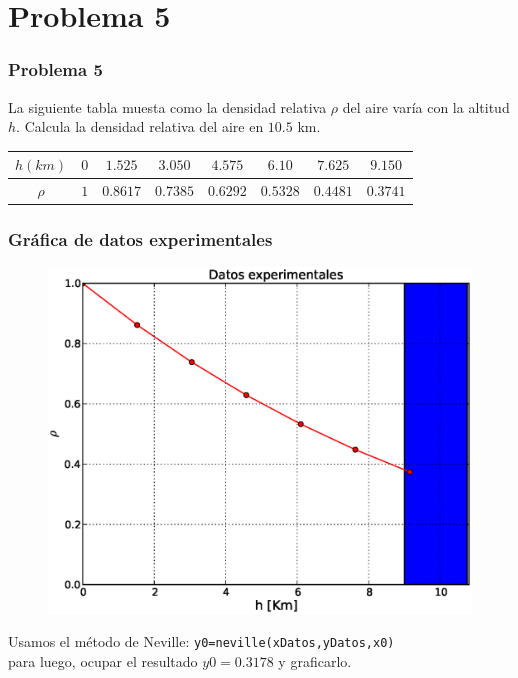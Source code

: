 \section{Problema 5}
\begin{frame}
\frametitle{Problema 5}
La siguiente tabla muesta como la densidad relativa $\rho$ del aire var\'{i}a con la altitud $h$. Calcula la densidad relativa del aire en $10.5$ km.
	\begin{table}[H]
		\centering 
		\fontsize{12}{12}\selectfont
			\begin{tabulary}{15cm}{c | c | c | c | c | c | c | c }
				$h(km)$ & $0$ & $1.525$ & $3.050$ & $4.575$ & $6.10$ & $7.625$ & $9.150$ \\
				\midrule
				$\rho$ & $1$ & $0.8617$ & $0.7385$ & $0.6292$ & $0.5328$ & $0.4481$ & $0.3741$ 
			\end{tabulary}
	\end{table}
\end{frame}
\begin{frame}
\frametitle{Gr\'{a}fica de datos experimentales}
\begin{figure}
	\centering
	\includegraphics[scale=0.45]{Imagenes/Tarea_Raices_Problema_5_01.eps}
\end{figure}
\end{frame}
\begin{frame}[fragile]
Usamos el m\'{e}todo de Neville: \verb|y0=neville(xDatos,yDatos,x0)|
\\
\bigskip
para luego, ocupar el resultado $y0=0.3178$ y graficarlo.
\end{frame}
